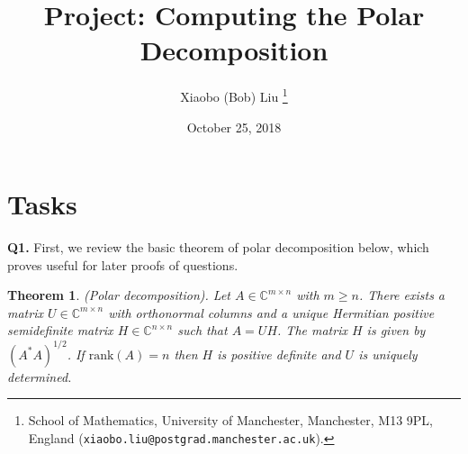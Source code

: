 \documentclass[12pt]{article}
\title{Project: Computing the Polar Decomposition}
\author{Xiaobo (Bob) Liu%
        \thanks{%
                School of Mathematics,
                University of Manchester,
                Manchester, M13 9PL, England
                (\texttt{xiaobo.liu@postgrad.manchester.ac.uk}).
               }
}
\date{October 25, 2018}
\def\C{\mathbb{C}}
\def\nbyn{n \times n}
\def\mbyn{m \times n}
\newtheorem{theorem}{Theorem}
\begin{document}
\maketitle

\section*{Tasks}
{\bf Q1.} First, we review the basic theorem of polar decomposition below, which proves useful for later proofs of questions.
\begin{theorem}\label{polardecom}
	(Polar decomposition). Let $A\in\C^{\mbyn}$ with $m\ge n$. There exists a matrix $U\in\C^{\mbyn}$ with orthonormal columns and a unique Hermitian positive semidefinite matrix $H\in\C^{\nbyn}$ such that $A=UH$. The matrix $H$ is given by $(A^*A)^{1/2}$. If $\text{rank}(A)=n$ then $H$ is positive definite and $U$ is uniquely determined.
	
\end{theorem}
\unskip
\end{document}
